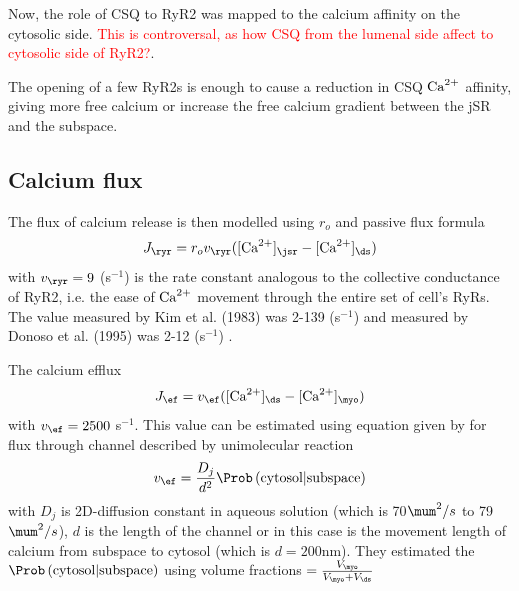 %


Now, the role of CSQ to RyR2 was mapped to the calcium affinity on the cytosolic
side. \textcolor{red}{This is controversal, as how CSQ from the lumenal side
affect to cytosolic side of RyR2?}.

The opening of a few RyR2s is enough to cause a reduction in CSQ ${\text{Ca}^{2+}}$ affinity,
giving more free calcium or increase the free calcium gradient between the jSR
and the subspace.

\subsection{Calcium flux}

The flux of calcium release is then modelled using $r_o$ and passive flux
formula
\begin{equation}
J_\ryr = r_o v_\ryr ([\Ca]_\jsr - [\Ca]_\ds)
\end{equation}
with $v_\ryr = 9$ (s$^{-1}$) is the rate constant analogous to the collective
conductance of RyR2, i.e. the ease of ${\text{Ca}^{2+}}$ movement through the entire set of
cell's RyRs. The value measured by Kim et al. (1983) was 2-139 (s$^{-1}$)
\citep{Kim1983} and measured by Donoso et al. (1995) was 2-12 (s$^{-1}$)
\citep{Donoso1995}.

The calcium efflux
\begin{equation}
J_\ef = v_\ef ([\Ca]_\ds - [\Ca]_\myo)
\end{equation}
with $v_\ef = 2500$ s$^{-1}$. This value can be estimated using equation given
by \citep{Chen1997} for flux through channel described by unimolecular reaction
\begin{equation}
v_\ef = \frac{D_j}{d^2}\Prob \left( \text{cytosol} | \text{subspace} \right)
\end{equation}
with $D_j$ is 2D-diffusion constant in aqueous solution (which is 70$\mum^2/s$
to 79$\mum^2/s$), $d$ is the length of the channel or in this case is the
movement length of calcium from subspace to cytosol (which is $d=200$nm). They
estimated the $\Prob\left( \text{cytosol} | \text{subspace} \right)$ using
volume fractions $=\frac{V_\myo}{V_\myo+V_\ds}$

